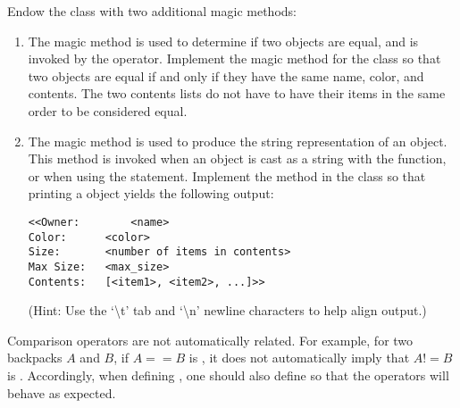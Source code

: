 \begin{problem}
Endow the  class with two additional magic methods:
\begin{enumerate}
\item The  magic method is used to determine if two objects are equal, and is invoked by the \li{==} operator.
Implement the  magic method for the  class so that two  objects are equal if and only if they have the same name, color, and contents.
The two contents lists do not have to have their items in the same order to be considered equal.

\item The  magic method is used to produce the string representation of an object.
This method is invoked when an object is cast as a string with the  function, or when using the  statement.
Implement the  method in the  class so that printing a  object yields the following output:
\begin{lstlisting}
<<Owner:		<name>
Color:		<color>
Size:       <number of items in contents>
Max Size:   <max_size>
Contents:   [<item1>, <item2>, ...]>>
\end{lstlisting}
(Hint: Use the `\textbackslash{t}' tab and `\textbackslash{n}' newline characters to help align output.)
\end{enumerate}
\end{problem}

\begin{warn}
Comparison operators are not automatically related.
For example, for two backpacks $A$ and $B$, if $A==B$ is , it does not automatically imply that $A!=B$ is .
Accordingly, when defining , one should also define  so that the operators will behave as expected.
\end{warn}

